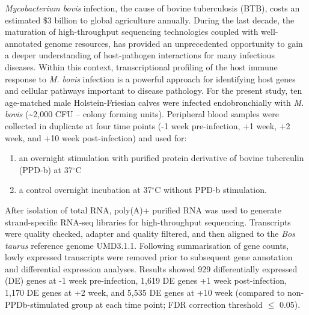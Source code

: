 \documentclass[\main/boa.tex]{subfiles}
\begin{document}
\emph{Mycobacterium bovis} infection, the cause of bovine tuberculosis
(BTB), costs an estimated \$3 billion to global agriculture annually.
During the last decade, the maturation of high-throughput sequencing
technologies coupled with well-annotated genome resources, has provided
an unprecedented opportunity to gain a deeper understanding of
host-pathogen interactions for many infectious diseases. Within this
context, transcriptional profiling of the host immune response to
\emph{M. bovis} infection is a powerful approach for identifying host
genes and cellular pathways important to disease pathology. For the
present study, ten age-matched male Holstein-Friesian calves were
infected endobronchially with \emph{M. bovis} (\textasciitilde{}2,000
CFU -- colony forming units). Peripheral blood samples were collected in
duplicate at four time points (-1 week pre-infection, +1 week, +2 week,
and +10 week post-infection) and used for:

\begin{enumerate}
\def\labelenumi{\alph{enumi}.}
\tightlist
\item
  an overnight stimulation with purified protein derivative of bovine
  tuberculin (PPD-b) at 37\(^\circ\)C
\item
  a control overnight incubation at 37\(^\circ\)C without PPD-b
  stimulation.
\end{enumerate}

After isolation of total RNA, poly(A)+ purified RNA was used to generate
strand-specific RNA-seq libraries for high-throughput sequencing.
Transcripts were quality checked, adapter and quality filtered, and then
aligned to the \emph{Bos taurus} reference genome UMD3.1.1. Following
summarisation of gene counts, lowly expressed transcripts were removed
prior to subsequent gene annotation and differential expression
analyses. Results showed 929 differentially expressed (DE) genes at -1
week pre-infection, 1,619 DE genes +1 week post-infection, 1,170 DE
genes at +2 week, and 5,535 DE genes at +10 week (compared to
non-PPDb-stimulated group at each time point; FDR correction threshold
\(\leq\) 0.05).
\end{document}
